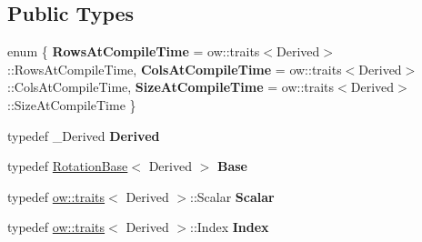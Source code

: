 \subsection*{Public Types}
\begin{DoxyCompactItemize}
\item 
enum \{ {\bfseries Rows\+At\+Compile\+Time} = ow\+:\+:traits$<$Derived$>$\+:\+:Rows\+At\+Compile\+Time, 
{\bfseries Cols\+At\+Compile\+Time} = ow\+:\+:traits$<$Derived$>$\+:\+:Cols\+At\+Compile\+Time, 
{\bfseries Size\+At\+Compile\+Time} = ow\+:\+:traits$<$Derived$>$\+:\+:Size\+At\+Compile\+Time
 \}\hypertarget{classow__core_1_1QuaternionBase_acd90af029ce4d3dd263f4e32bd3741be}{}\label{classow__core_1_1QuaternionBase_acd90af029ce4d3dd263f4e32bd3741be}

\item 
typedef \+\_\+\+Derived {\bfseries Derived}\hypertarget{classow__core_1_1QuaternionBase_ae1e83ff5375a8ec6909e402273ca1adc}{}\label{classow__core_1_1QuaternionBase_ae1e83ff5375a8ec6909e402273ca1adc}

\item 
typedef \hyperlink{classow__core_1_1RotationBase}{Rotation\+Base}$<$ Derived $>$ {\bfseries Base}\hypertarget{classow__core_1_1QuaternionBase_a1232a140d42fbc302cc797758ec9d8ee}{}\label{classow__core_1_1QuaternionBase_a1232a140d42fbc302cc797758ec9d8ee}

\item 
typedef \hyperlink{structow_1_1traits}{ow\+::traits}$<$ Derived $>$\+::Scalar {\bfseries Scalar}\hypertarget{classow__core_1_1QuaternionBase_a0dd469b8f5c24290e926a3b8fa0b9ad9}{}\label{classow__core_1_1QuaternionBase_a0dd469b8f5c24290e926a3b8fa0b9ad9}

\item 
typedef \hyperlink{structow_1_1traits}{ow\+::traits}$<$ Derived $>$\+::Index {\bfseries Index}\hypertarget{classow__core_1_1QuaternionBase_ad7b8551451bb47f43bf33a8f43bbc2cf}{}\label{classow__core_1_1QuaternionBase_ad7b8551451bb47f43bf33a8f43bbc2cf}

\end{DoxyCompactItemize}
